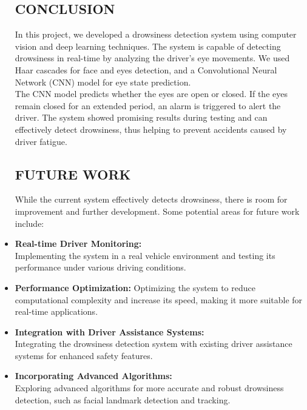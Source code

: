 \documentclass[12pt]{article}
\begin{document}
\begin{itemize}
\subsection{CONCLUSION}
In this project, we developed a drowsiness detection system using computer vision and deep learning techniques. The system is capable of detecting drowsiness in real-time by analyzing the driver's eye movements.
We used Haar cascades for face and eyes detection, and a Convolutional Neural Network (CNN) model for eye state prediction. \\The CNN model predicts whether the eyes are open or closed. If the eyes remain closed for an extended period, an alarm is triggered to alert the driver.
The system showed promising results during testing and can effectively detect drowsiness, thus helping to prevent accidents caused by driver fatigue.

\subsection{FUTURE WORK }
While the current system effectively detects drowsiness, there is room for improvement and further development. Some potential areas for future work include: \item \textbf{Real-time Driver Monitoring:}\\
Implementing the system in a real vehicle environment and testing its performance under various driving conditions.
\item \textbf{Performance Optimization:} Optimizing the system to reduce computational complexity and increase its speed, making it more suitable for real-time applications.
\item \textbf{Integration with Driver Assistance Systems:} \\
Integrating the drowsiness detection system with existing driver assistance systems for enhanced safety features.
\item \textbf{Incorporating Advanced Algorithms:}\\
Exploring advanced algorithms for more accurate and robust drowsiness detection, such as facial landmark detection and tracking.


\end{itemize}
\end{document}
